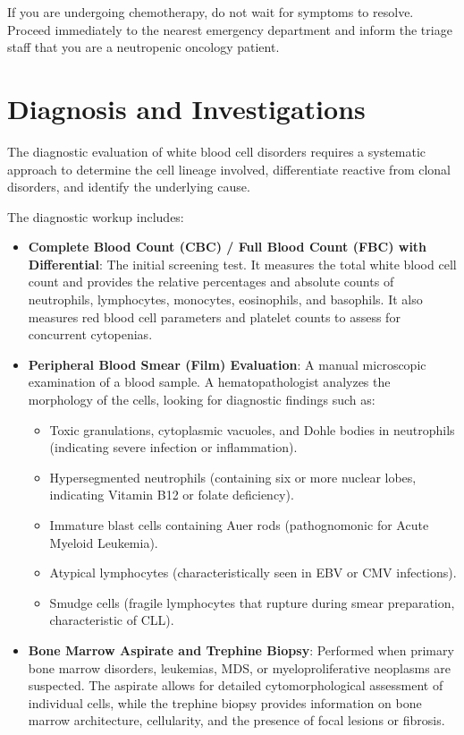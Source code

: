 If you are undergoing chemotherapy, do not wait for symptoms to resolve. Proceed immediately to the nearest emergency department and inform the triage staff that you are a neutropenic oncology patient.

\section*{Diagnosis and Investigations}
The diagnostic evaluation of white blood cell disorders requires a systematic approach to determine the cell lineage involved, differentiate reactive from clonal disorders, and identify the underlying cause.

The diagnostic workup includes:
\begin{itemize}
  \item \textbf{Complete Blood Count (CBC) / Full Blood Count (FBC) with Differential}: The initial screening test. It measures the total white blood cell count and provides the relative percentages and absolute counts of neutrophils, lymphocytes, monocytes, eosinophils, and basophils. It also measures red blood cell parameters and platelet counts to assess for concurrent cytopenias.
  \item \textbf{Peripheral Blood Smear (Film) Evaluation}: A manual microscopic examination of a blood sample. A hematopathologist analyzes the morphology of the cells, looking for diagnostic findings such as:
    \begin{itemize}
      \item Toxic granulations, cytoplasmic vacuoles, and Dohle bodies in neutrophils (indicating severe infection or inflammation).
      \item Hypersegmented neutrophils (containing six or more nuclear lobes, indicating Vitamin B12 or folate deficiency).
      \item Immature blast cells containing Auer rods (pathognomonic for Acute Myeloid Leukemia).
      \item Atypical lymphocytes (characteristically seen in EBV or CMV infections).
      \item Smudge cells (fragile lymphocytes that rupture during smear preparation, characteristic of CLL).
    \end{itemize}
  \item \textbf{Bone Marrow Aspirate and Trephine Biopsy}: Performed when primary bone marrow disorders, leukemias, MDS, or myeloproliferative neoplasms are suspected. The aspirate allows for detailed cytomorphological assessment of individual cells, while the trephine biopsy provides information on bone marrow architecture, cellularity, and the presence of focal lesions or fibrosis.

\end{itemize}
